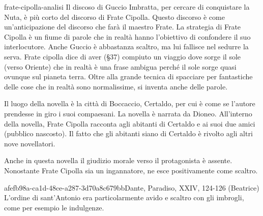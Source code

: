 \documentclass[preview]{standalone}
\begin{document}
\begin{snippet}{frate-cipolla-analisi}
    Il discoso di Guccio Imbratta, per cercare di conquistare la Nuta, è più corto del discorso di Frate Cipolla.
    Questo discorso è come un'anticipazione del discorso che farà il maestro Frate.
    La strategia di Frate Cipolla è un fiume di parole che in realtà hanno l'obiettivo di confondere il suo interlocutore.
    Anche Guccio è abbastanza scaltro, ma lui fallisce nel sedurre la serva.
    Frate cipolla dice di aver (§37) compiuto un viaggio dove sorge il sole (verso Oriente)
    che in realtà è una frase ambigua perché il sole sorge quasi ovunque sul pianeta terra.
    Oltre alla grande tecnica di spacciare per fantastiche delle cose che in realtà sono normalissime,
    si inventa anche delle parole.
    
    Il luogo della novella è la città di Boccaccio, Certaldo, per cui è come se l'autore prendesse in giro i suoi compaesani.
    La novella è narrata da Dioneo.
    All'interno della novella, Frate Cipolla racconta agli abitanti di Certaldo e ai suoi due amici (pubblico nascosto).
    Il fatto che gli abitanti siano di Certaldo è rivolto agli altri nove novellatori.
    
    Anche in questa novella il giudizio morale verso il protagonista è assente.
    Nonostante Frate Cipolla sia un ingannatore, ne esce positivamente come scaltro.
\end{snippet}

\begin{snote}{afefb98a-ca1d-48ce-a287-3d70a8c679bb}{Dante, Paradiso, XXIV, 124-126 (Beatrice)}
    L'ordine di sant'Antonio era particolarmente avido e scaltro con gli imbrogli,
    come per esempio le indulgenze.
\end{snote}
\end{document}
